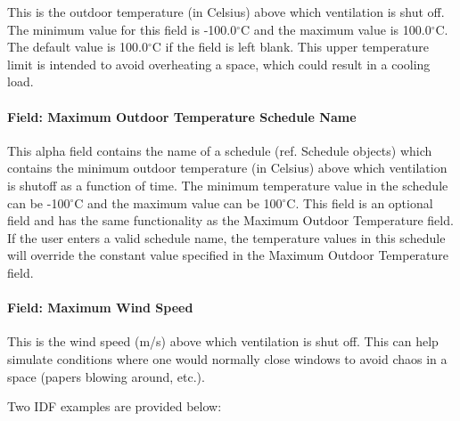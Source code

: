 This is the outdoor temperature (in Celsius) above which ventilation is shut off. The minimum value for this field is -100.0$^\circ$C and the maximum value is 100.0$^\circ$C. The default value is 100.0$^\circ$C if the field is left blank. This upper temperature limit is intended to avoid overheating a space, which could result in a cooling load.

\paragraph{Field: Maximum Outdoor Temperature Schedule Name}\label{field-maximum-outdoor-temperature-schedule-name}

This alpha field contains the name of a schedule (ref. Schedule objects) which contains the minimum outdoor temperature (in Celsius) above which ventilation is shutoff as a function of time. The minimum temperature value in the schedule can be -100$^\circ$C and the maximum value can be 100$^\circ$C. This field is an optional field and has the same functionality as the Maximum Outdoor Temperature field. If the user enters a valid schedule name, the temperature values in this schedule will override the constant value specified in the Maximum Outdoor Temperature field.

\paragraph{Field: Maximum Wind Speed}\label{field-maximum-wind-speed}

This is the wind speed (m/s) above which ventilation is shut off. This can help simulate conditions where one would normally close windows to avoid chaos in a space (papers blowing around, etc.).

Two IDF examples are provided below:

